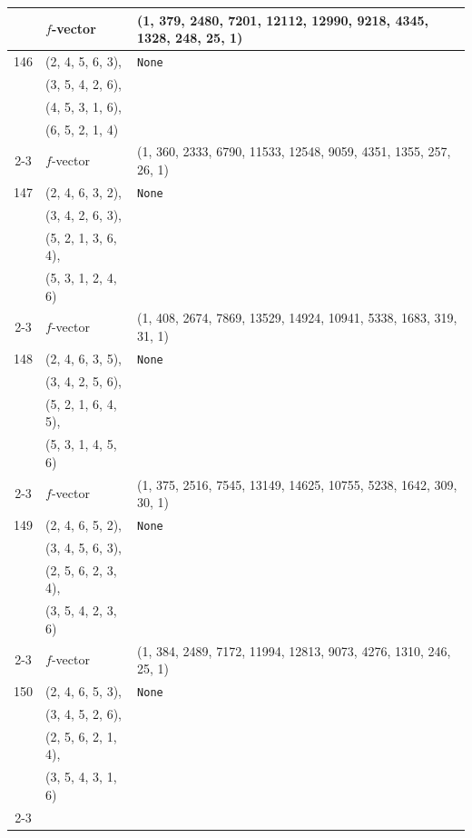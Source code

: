 \documentclass[10pt]{amsart}
\numberwithin{equation}{section}
\theoremstyle{plain}
\theoremstyle{definition}
\theoremstyle{remark}
\begin{document}
{\begin{longtable}{c|l|l}
		& $f$-vector & {(1, 379, 2480, 7201, 12112, 12990, 9218, 4345, 1328, 248, 25, 1)} \\
		\midrule
		
		146 & (2, 4, 5, 6, 3), & \texttt{None} \\
		& (3, 5, 4, 2, 6), &  \\
		& (4, 5, 3, 1, 6), &  \\
		& (6, 5, 2, 1, 4) &  \\ \cline{2-3}
		
		& $f$-vector & {(1, 360, 2333, 6790, 11533, 12548, 9059, 4351, 1355, 257, 26, 1)} \\
		\midrule
		
		147 & (2, 4, 6, 3, 2), & \texttt{None} \\
		& (3, 4, 2, 6, 3), &  \\
		& (5, 2, 1, 3, 6, 4), &  \\
		& (5, 3, 1, 2, 4, 6) &  \\ \cline{2-3}
		
		& $f$-vector & {(1, 408, 2674, 7869, 13529, 14924, 10941, 5338, 1683, 319, 31, 1)} \\
		\midrule
		
		148 & (2, 4, 6, 3, 5), & \texttt{None} \\
		& (3, 4, 2, 5, 6), &  \\
		& (5, 2, 1, 6, 4, 5), &  \\
		& (5, 3, 1, 4, 5, 6) &  \\ \cline{2-3}
		
		& $f$-vector & {(1, 375, 2516, 7545, 13149, 14625, 10755, 5238, 1642, 309, 30, 1)} \\
		\midrule
		
		149 & (2, 4, 6, 5, 2), & \texttt{None} \\
		& (3, 4, 5, 6, 3), &  \\
		& (2, 5, 6, 2, 3, 4), &  \\
		& (3, 5, 4, 2, 3, 6) &  \\ \cline{2-3}
		
		& $f$-vector & {(1, 384, 2489, 7172, 11994, 12813, 9073, 4276, 1310, 246, 25, 1)} \\
		\midrule
		
		150 & (2, 4, 6, 5, 3), & \texttt{None} \\
		& (3, 4, 5, 2, 6), &  \\
		& (2, 5, 6, 2, 1, 4), &  \\
		& (3, 5, 4, 3, 1, 6) &  \\ \cline{2-3}
		

\end{longtable}}
\end{document}
